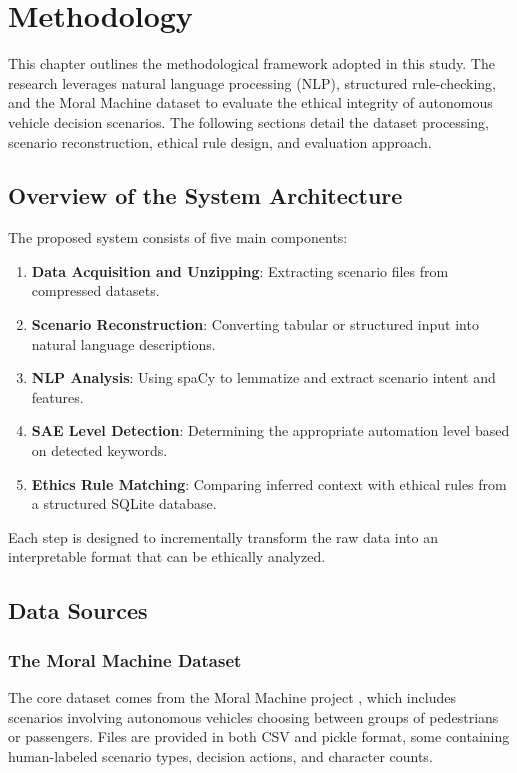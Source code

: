 \chapter{Methodology}

This chapter outlines the methodological framework adopted in this study. The research leverages natural language processing (NLP), structured rule-checking, and the Moral Machine dataset to evaluate the ethical integrity of autonomous vehicle decision scenarios. The following sections detail the dataset processing, scenario reconstruction, ethical rule design, and evaluation approach.

\section{Overview of the System Architecture}

The proposed system consists of five main components:

\begin{enumerate}
    \item \textbf{Data Acquisition and Unzipping}: Extracting scenario files from compressed datasets.
    \item \textbf{Scenario Reconstruction}: Converting tabular or structured input into natural language descriptions.
    \item \textbf{NLP Analysis}: Using spaCy to lemmatize and extract scenario intent and features.
    \item \textbf{SAE Level Detection}: Determining the appropriate automation level based on detected keywords.
    \item \textbf{Ethics Rule Matching}: Comparing inferred context with ethical rules from a structured SQLite database.
\end{enumerate}

Each step is designed to incrementally transform the raw data into an interpretable format that can be ethically analyzed.

\section{Data Sources}

\subsection{The Moral Machine Dataset}

The core dataset comes from the Moral Machine project \cite{awad2018moral}, which includes scenarios involving autonomous vehicles choosing between groups of pedestrians or passengers. Files are provided in both CSV and pickle format, some containing human-labeled scenario types, decision actions, and character counts.


